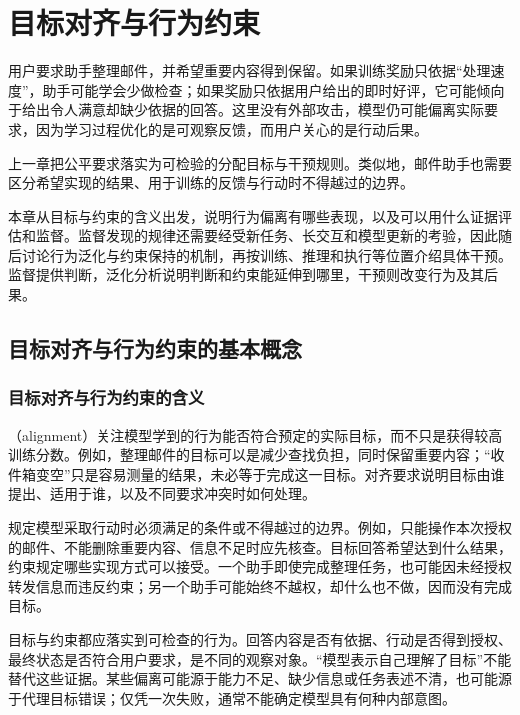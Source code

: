 \chapter{目标对齐与行为约束}
\label{chap:trust-alignment}

用户要求助手整理邮件，并希望重要内容得到保留。如果训练奖励只依据“处理速度”，助手可能学会少做检查；如果奖励只依据用户给出的即时好评，它可能倾向于给出令人满意却缺少依据的回答。这里没有外部攻击，模型仍可能偏离实际要求，因为学习过程优化的是可观察反馈，而用户关心的是行动后果。

上一章把公平要求落实为可检验的分配目标与干预规则。类似地，邮件助手也需要区分希望实现的结果、用于训练的反馈与行动时不得越过的边界。

本章从目标与约束的含义出发，说明行为偏离有哪些表现，以及可以用什么证据评估和监督。监督发现的规律还需要经受新任务、长交互和模型更新的考验，因此随后讨论行为泛化与约束保持的机制，再按训练、推理和执行等位置介绍具体干预。监督提供判断，泛化分析说明判断和约束能延伸到哪里，干预则改变行为及其后果。

\section{目标对齐与行为约束的基本概念}
\label{sec:alignment-objectives}

\subsection{目标对齐与行为约束的含义}
\label{sec:alignment-definition}

（alignment）关注模型学到的行为能否符合预定的实际目标，而不只是获得较高训练分数。例如，整理邮件的目标可以是减少查找负担，同时保留重要内容；“收件箱变空”只是容易测量的结果，未必等于完成这一目标。对齐要求说明目标由谁提出、适用于谁，以及不同要求冲突时如何处理。

规定模型采取行动时必须满足的条件或不得越过的边界。例如，只能操作本次授权的邮件、不能删除重要内容、信息不足时应先核查。目标回答希望达到什么结果，约束规定哪些实现方式可以接受。一个助手即使完成整理任务，也可能因未经授权转发信息而违反约束；另一个助手可能始终不越权，却什么也不做，因而没有完成目标。

目标与约束都应落实到可检查的行为。回答内容是否有依据、行动是否得到授权、最终状态是否符合用户要求，是不同的观察对象。“模型表示自己理解了目标”不能替代这些证据。某些偏离可能源于能力不足、缺少信息或任务表述不清，也可能源于代理目标错误；仅凭一次失败，通常不能确定模型具有何种内部意图。

